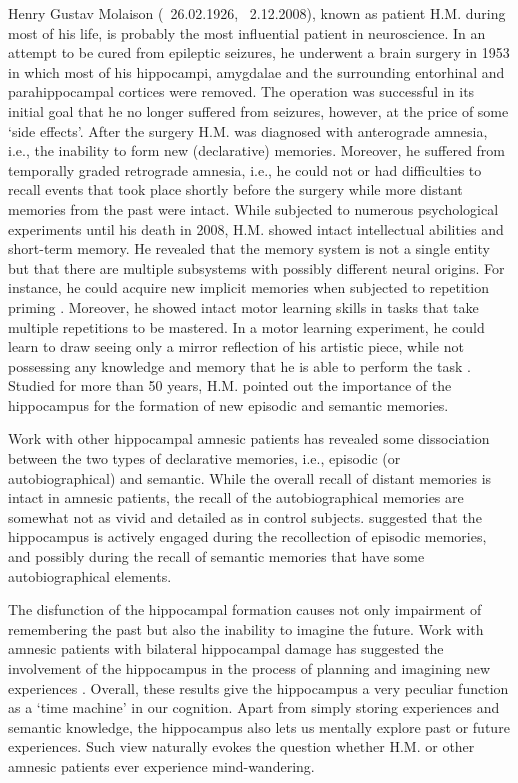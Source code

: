    Henry Gustav Molaison (\textborn~26.02.1926, \textdagger~2.12.2008), known
    as patient H.M. during most of his life, is probably the most influential
    patient in neuroscience. In an attempt to be cured from epileptic seizures,
    he underwent a brain surgery in 1953 in which most of his hippocampi,
    amygdalae and the surrounding entorhinal and parahippocampal cortices were
    removed. The operation was successful in its initial goal that he no longer
    suffered from seizures, however, at the price of some `side effects'. After
    the surgery H.M. was diagnosed with anterograde amnesia, i.e., the
    inability to form new (declarative) memories. Moreover, he suffered from
    temporally graded retrograde amnesia, i.e., he could not or had
    difficulties to recall events that took place shortly before the surgery
    while more distant memories from the past were intact. While subjected to
    numerous psychological experiments until his death in 2008, H.M. showed
    intact intellectual abilities and short-term memory. He revealed that the
    memory system is not a single entity but that there are multiple subsystems
    with possibly different neural origins. For instance, he could acquire new
    implicit memories when subjected to repetition priming \citep{Corkin2002}.
    Moreover, he showed intact motor learning skills in tasks that take
    multiple repetitions to be mastered. In a motor learning experiment, he could
    learn to draw seeing only a mirror reflection of his artistic piece, while
    not possessing any knowledge and memory that he is able to perform the task
    \citep{Corkin1968}. Studied for more than 50 years, H.M. pointed out the
    importance of the hippocampus for the formation of new episodic and
    semantic memories.

    Work with other hippocampal amnesic patients has revealed some
    dissociation between the two types of declarative memories, i.e., episodic
    (or autobiographical) and semantic. While the overall recall of distant
    memories is intact in amnesic patients, the recall of the autobiographical
    memories are somewhat not as vivid and detailed as in control subjects.
    \cite{Moscovitch2005} suggested that the hippocampus is actively engaged
    during the recollection of episodic memories, and possibly during the
    recall of semantic memories that have some autobiographical elements.

    The disfunction of the hippocampal formation causes not only impairment of
    remembering the past but also the inability to imagine the future. Work with
    amnesic patients with bilateral hippocampal damage has suggested the
    involvement of the hippocampus in the process of planning and imagining new
    experiences \citep{Klein2002, Hassabis2007}. Overall, these results give
    the hippocampus a very peculiar function as a `time machine' in our
    cognition. Apart from simply storing experiences and semantic knowledge,
    the hippocampus also lets us mentally explore past or future experiences.
    Such view naturally evokes the question whether H.M. or other amnesic
    patients ever experience mind-wandering.

